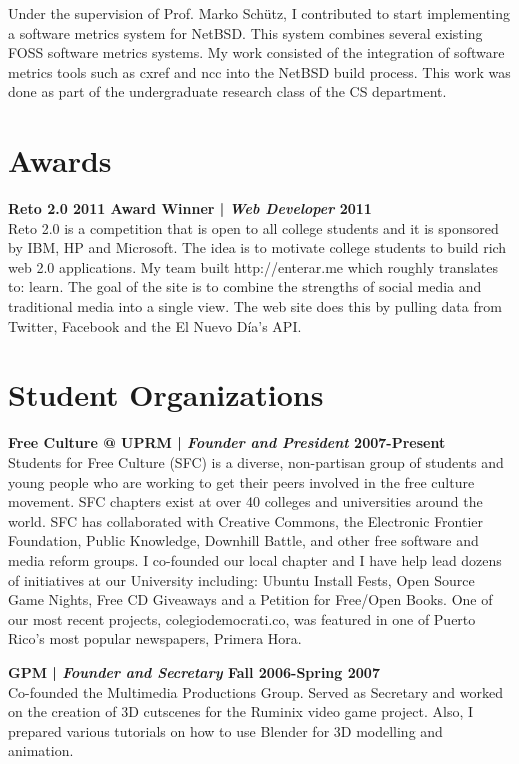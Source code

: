 \documentclass[margin,line]{res}
\begin{document}
\begin{resume}
Under the supervision of Prof. Marko Schütz, I contributed to start implementing a software metrics system for NetBSD. This system combines several existing FOSS software metrics systems. My work consisted of the integration of software metrics tools such as cxref and ncc into the NetBSD build process. This work was done as part of the undergraduate research class of the CS department.

\section{\sc Awards}

{\bf Reto 2.0 2011 Award Winner | {\em Web Developer} \hfill {\bf 2011 \\} }
\vspace{-.01cm}
Reto 2.0 is a competition that is open to all college students and it is sponsored by IBM, HP and Microsoft. The idea is to motivate college students to build rich web 2.0 applications. My team built http://enterar.me which roughly translates to: learn. The goal of the site is to combine the strengths of social media and traditional media into a single view. The web site does this by pulling data from Twitter, Facebook and the El Nuevo Día's API.

\section{\sc Student Organizations}

{\bf Free Culture @ UPRM | {\em Founder and President} \hfill {\bf 2007-Present \\} }
\vspace{-.01cm}
Students for Free Culture (SFC) is a diverse, non-partisan group of students and young people who are working to get their peers involved in the free culture movement. SFC chapters exist at over 40 colleges and universities around the world. SFC has collaborated with Creative Commons, the Electronic Frontier Foundation, Public Knowledge, Downhill Battle, and other free software and media reform groups. I co-founded our local chapter and I have help lead dozens of initiatives at our University including: Ubuntu Install Fests, Open Source Game Nights, Free CD Giveaways and a Petition for Free/Open Books. One of our most recent projects, colegiodemocrati.co, was featured in one of Puerto Rico's most popular newspapers, Primera Hora.

{\bf GPM | {\em Founder and Secretary} \hfill {\bf Fall 2006-Spring 2007 \\} }
\vspace{-.01cm}
Co-founded the Multimedia Productions Group. Served as Secretary and worked on the creation of 3D cutscenes for the Ruminix video game project. Also, I prepared various tutorials on how to use Blender for 3D modelling and animation.


\end{resume}
\end{document}

